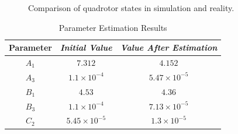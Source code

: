 \documentclass[conference]{IEEEtran}
\begin{document}
\begin{figure}[!h]
	\centering
	\hfil
	\hfil
	\caption{Comparison of quadrotor states in simulation and reality.} \label{fig_sim}
\end{figure}


\begin{table}[!h]
	\renewcommand{\arraystretch}{1.3}
	\caption{Parameter Estimation Results}
	\begin{center}
	\begin{tabular}{c c c}
	\hline
	\textbf{Parameter} & \textbf{\textit{Initial Value}}& \textbf{\textit{Value After Estimation}} \\
	\hline
	$A_1$ & $7.312$ & $4.152$ \\
	$A_3$  & $1.1\times10^{-4}$ & $5.47\times10^{-5}$\\
	$B_1$  & $4.53$ & $4.36$ \\
	$B_3$  & $1.1\times10^{-4}$ & $7.13\times10^{-5}$ \\ 
	$C_2$  & $5.45\times10^{-5}$ & $1.3\times10^{-5}$ \\
	\hline
	\end{tabular}
	\label{tab1}
	\end{center}
\end{table}
\end{document}
